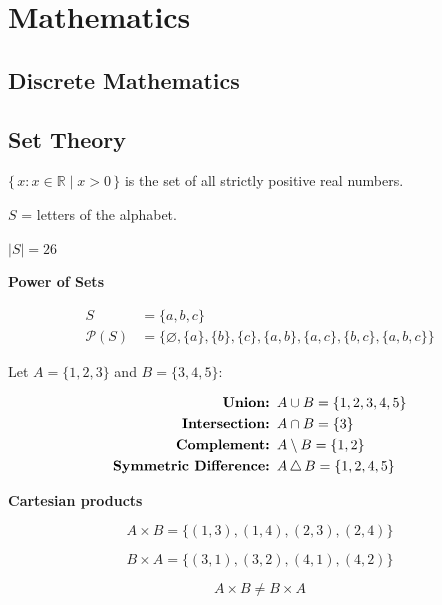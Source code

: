 \documentclass[../../2_codex]{subfiles}
\begin{document}
\chapter{Mathematics}

\section{Discrete Mathematics}



\section{Set Theory}

$\{\, x : x \in \mathbb{R} \mid x > 0 \,\}$ is the set of all strictly positive real numbers.

$S$ = letters of the alphabet.

$|S| = 26$

\textbf{Power of Sets}

\begin{align*}
S &= \{a, b, c\} \\
\mathcal{P}(S) &= \{\varnothing, \{a\}, \{b\}, \{c\}, \{a,b\}, \{a,c\}, \{b,c\}, \{a,b,c\}\}
\end{align*}

Let $A = \{1, 2, 3\}$ and $B = \{3, 4, 5\}$:

\begin{align*}
    \text{\textbf{Union: }} & A \cup B = \{1, 2, 3, 4, 5\} \\
    \text{\textbf{Intersection: }} & A \cap B = \{3\} \\
    \text{\textbf{Complement: }} & A \setminus B = \{1, 2\} \\
    \text{\textbf{Symmetric Difference: }} & A \,\triangle\, B = \{1, 2, 4, 5\}
\end{align*}

\textbf{Cartesian products}

\[
A \times B = \{(1,3), (1,4), (2,3), (2,4)\}
\]

\[
B \times A = \{(3,1), (3,2), (4,1), (4,2)\}
\]

\[
A \times B \neq B \times A
\]
\end{document}
